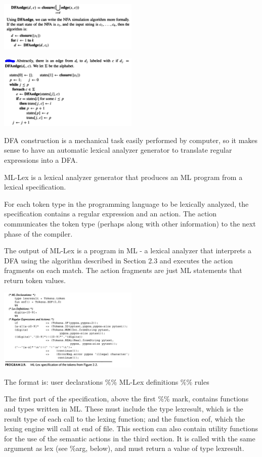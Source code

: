 \documentclass[8pt, a4paper, oneside, twocolumn]{extarticle}
\begin{document}
\includegraphics[width=0.5\textwidth,height=0.5\textheight,keepaspectratio]{nfa1}

\includegraphics[width=0.5\textwidth,height=0.5\textheight,keepaspectratio]{nfa2}

DFA construction is a mechanical task easily performed by computer, so it 
makes sense to have an automatic lexical analyzer generator to translate  
regular expressions into a DFA. 

ML-Lex is a lexical analyzer generator that produces an ML program from 
a lexical specification. 

For each token type in the programming language to 
be lexically analyzed, the specification contains a regular expression and an 
action. The action communicates the token type (perhaps along with other 
information) to the next phase of the compiler. 

The output of ML-Lex is a program in ML - a lexical analyzer that  
interprets a DFA using the algorithm described in Section 2.3 and executes the 
action fragments on each match. The action fragments are just ML statements 
that return token values. 

\includegraphics[width=0.5\textwidth,height=0.5\textheight,keepaspectratio]{lex}

The format is: user declarations \%\% ML-Lex definitions \%\% rules

The first part of the specification, above the first \%\% mark, contains  
functions and types written in ML. These must include the type lexresult, 
which is the result type of each call to the lexing function; and the  
function eof, which the lexing engine will call at end of file. This section can 
also contain utility functions for the use of the semantic actions in the third 
section. It is called with the same argument as lex (see \%arg, below), and must return a value of type lexresult. 
\end{document}
